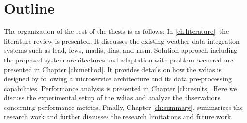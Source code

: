\section{Outline}
The organization of the rest of the thesis is as follows; In \cref{ch:literature}, the literature review is presented. It discusses the existing weather data integration systems such as \acrshort{lead}, \acrshort{fews}, \acrshort{madis}, \acrshort{dias}, and \acrshort{msm}. Solution approach including the proposed system architectures and adaptation with problem occurred are presented in Chapter \ref{ch:method}. It provides details on how the \acrshort{wdias} is designed by following a microservice architecture and its data pre-processing capabilities. Performance analysis is presented in Chapter \ref{ch:results}. Here we discuss the experimental setup of the \acrshort{wdias} and analyze the observations concerning performance metrics. Finally, Chapter \ref{ch:summary}, summarizes the research work and further discusses the research limitations and future work.
